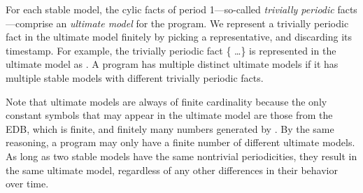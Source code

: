 
\begin{definition}
For each stable model, the cylic facts of period 1---so-called {\em trivially periodic} facts---comprise an {\em ultimate model} for the program.  We represent a trivially periodic fact in the ultimate model finitely by picking a representative, and discarding its timestamp.  For example, the trivially periodic fact \{ \ldots\} is represented in the ultimate model as .  A program has multiple distinct ultimate models if it has multiple stable models with different trivially periodic facts.
\end{definition}

Note that ultimate models are always of finite cardinality because the only constant symbols that may appear in the ultimate model are those from the EDB, which is finite, and finitely many numbers generated by .  By the same reasoning, a \lang program may only have a finite number of different ultimate models.  As long as two stable models have the same nontrivial periodicities, they result in the same ultimate model, regardless of any other differences in their behavior over time.

%


